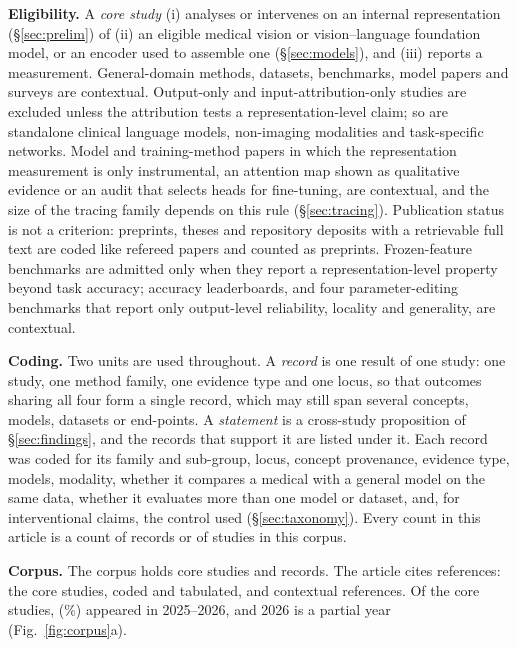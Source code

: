 \textbf{Eligibility.} A \emph{core study} (i) analyses or intervenes on an internal representation
(\S\ref{sec:prelim}) of (ii) an eligible medical vision or vision--language foundation model, or an
encoder used to assemble one (\S\ref{sec:models}), and (iii) reports a measurement. General-domain
methods, datasets, benchmarks, model papers and surveys are contextual. Output-only and
input-attribution-only studies are excluded unless the attribution tests a representation-level claim;
so are standalone clinical language models, non-imaging modalities and task-specific networks. Model and
training-method papers in which the representation measurement is only instrumental, an attention map
shown as qualitative evidence or an audit that selects heads for fine-tuning, are contextual, and the
size of the tracing family depends on this rule (\S\ref{sec:tracing}). Publication status is not a
criterion: preprints, theses and repository deposits with a retrievable full text are coded like refereed
papers and counted as preprints. Frozen-feature benchmarks are admitted only when they report a
representation-level property beyond task accuracy; accuracy leaderboards, and four parameter-editing
benchmarks that report only output-level reliability, locality and generality, are contextual.

\textbf{Coding.} Two units are used throughout. A \emph{record} is one result of one study: one study,
one method family, one evidence type and one locus, so that outcomes sharing all four form a single
record, which may still span several concepts, models, datasets or end-points. A \emph{statement} is a
cross-study proposition of \S\ref{sec:findings}, and the records that support it are listed under it.
Each record was coded for its family and sub-group, locus, concept provenance, evidence type, models,
modality, whether it compares a medical with a general model on the same data, whether it evaluates more
than one model or dataset, and, for interventional claims, the control used (\S\ref{sec:taxonomy}).
Every count in this article is a count of records or of studies in this corpus.

\textbf{Corpus.} The corpus holds \Ncore{} core studies and \Nclaims{} records. The article cites
\Ncited{} references: the \Ncore{} core studies, coded and tabulated, and \Ncontext{} contextual
references. Of the core studies, \Nrecent{} (\Pctrecent\%) appeared in 2025--2026, and 2026 is a partial
year (Fig.~\ref{fig:corpus}a).

